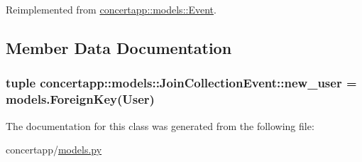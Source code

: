 Reimplemented from \hyperlink{classconcertapp_1_1models_1_1_event_a9a3f3dc074ee05120d953de9845080d0}{concertapp::models::Event}.



\subsection{Member Data Documentation}
\hypertarget{classconcertapp_1_1models_1_1_join_collection_event_ab275cc4d9199351bd8e869fa5cfc26e0}{
\subsubsection[{new\_\-user}]{\setlength{\rightskip}{0pt plus 5cm}tuple {\bf concertapp::models::JoinCollectionEvent::new\_\-user} = models.ForeignKey(User)}}
\label{classconcertapp_1_1models_1_1_join_collection_event_ab275cc4d9199351bd8e869fa5cfc26e0}


The documentation for this class was generated from the following file:\begin{DoxyCompactItemize}
\item 
concertapp/\hyperlink{models_8py}{models.py}\end{DoxyCompactItemize}
